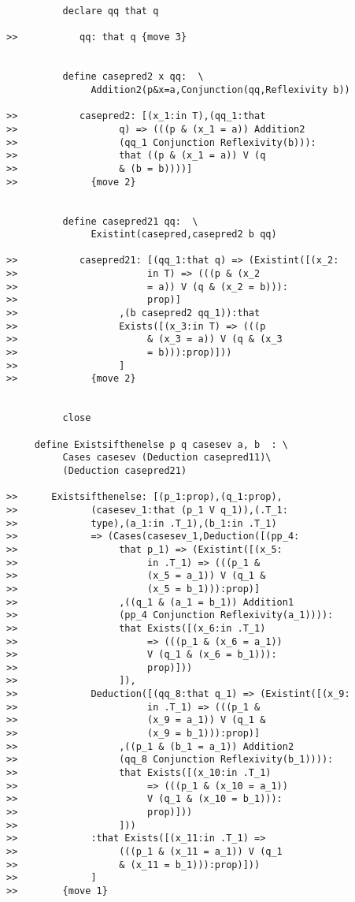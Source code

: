 \documentclass[12pt]{article}
\begin{document}
\begin{verbatim}
          declare qq that q

>>           qq: that q {move 3}


          define casepred2 x qq:  \
               Addition2(p&x=a,Conjunction(qq,Reflexivity b))

>>           casepred2: [(x_1:in T),(qq_1:that 
>>                  q) => (((p & (x_1 = a)) Addition2 
>>                  (qq_1 Conjunction Reflexivity(b))):
>>                  that ((p & (x_1 = a)) V (q 
>>                  & (b = b))))]
>>             {move 2}


          define casepred21 qq:  \
               Existint(casepred,casepred2 b qq)

>>           casepred21: [(qq_1:that q) => (Existint([(x_2:
>>                       in T) => (((p & (x_2 
>>                       = a)) V (q & (x_2 = b))):
>>                       prop)]
>>                  ,(b casepred2 qq_1)):that 
>>                  Exists([(x_3:in T) => (((p 
>>                       & (x_3 = a)) V (q & (x_3 
>>                       = b))):prop)]))
>>                  ]
>>             {move 2}


          close

     define Existsifthenelse p q casesev a, b  : \
          Cases casesev (Deduction casepred11)\
          (Deduction casepred21)

>>      Existsifthenelse: [(p_1:prop),(q_1:prop),
>>             (casesev_1:that (p_1 V q_1)),(.T_1:
>>             type),(a_1:in .T_1),(b_1:in .T_1) 
>>             => (Cases(casesev_1,Deduction([(pp_4:
>>                  that p_1) => (Existint([(x_5:
>>                       in .T_1) => (((p_1 & 
>>                       (x_5 = a_1)) V (q_1 & 
>>                       (x_5 = b_1))):prop)]
>>                  ,((q_1 & (a_1 = b_1)) Addition1 
>>                  (pp_4 Conjunction Reflexivity(a_1)))):
>>                  that Exists([(x_6:in .T_1) 
>>                       => (((p_1 & (x_6 = a_1)) 
>>                       V (q_1 & (x_6 = b_1))):
>>                       prop)]))
>>                  ]),
>>             Deduction([(qq_8:that q_1) => (Existint([(x_9:
>>                       in .T_1) => (((p_1 & 
>>                       (x_9 = a_1)) V (q_1 & 
>>                       (x_9 = b_1))):prop)]
>>                  ,((p_1 & (b_1 = a_1)) Addition2 
>>                  (qq_8 Conjunction Reflexivity(b_1)))):
>>                  that Exists([(x_10:in .T_1) 
>>                       => (((p_1 & (x_10 = a_1)) 
>>                       V (q_1 & (x_10 = b_1))):
>>                       prop)]))
>>                  ]))
>>             :that Exists([(x_11:in .T_1) => 
>>                  (((p_1 & (x_11 = a_1)) V (q_1 
>>                  & (x_11 = b_1))):prop)]))
>>             ]
>>        {move 1}



\end{verbatim}
\end{document}
